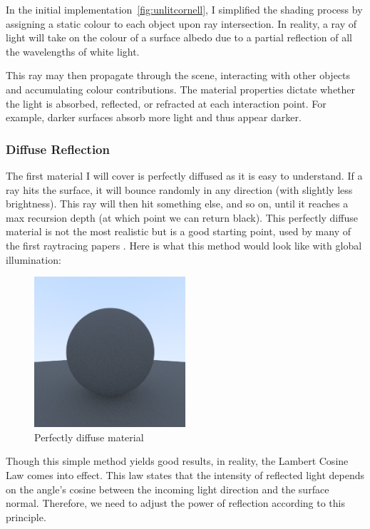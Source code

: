 \documentclass[12pt]{article}
\begin{document}
In the initial implementation~\ref{fig:unlitcornell}, I simplified the shading process by assigning a static colour to each object upon ray intersection. In reality, a ray of light will take on the colour of a surface albedo due to a partial reflection of all the wavelengths of white light.

This ray may then propagate through the scene, interacting with other objects and accumulating colour contributions. The material properties dictate whether the light is absorbed, reflected, or refracted at each interaction point. For example, darker surfaces absorb more light and thus appear darker.

\subsubsection{Diffuse Reflection}
The first material I will cover is perfectly diffused as it is easy to understand. If a ray hits the surface, it will bounce randomly in any direction (with slightly less brightness). This ray will then hit something else, and so on, until it reaches a max recursion depth (at which point we can return black). This perfectly diffuse material is not the most realistic but is a good starting point, used by many of the first raytracing papers \cite{Whitted1980}. Here is what this method would look like with global illumination:

\begin{figure}[H]
    \centering
    \includegraphics[width=0.5\textwidth]{images/lambertian/uniform_diffuse.png}
    \caption{Perfectly diffuse material}
    \label{fig:perfdiffmat}
\end{figure}

Though this simple method yields good results, in reality, the Lambert Cosine Law comes into effect. This law states that the intensity of reflected light depends on the angle's cosine between the incoming light direction and the surface normal. Therefore, we need to adjust the power of reflection according to this principle.
\end{document}
